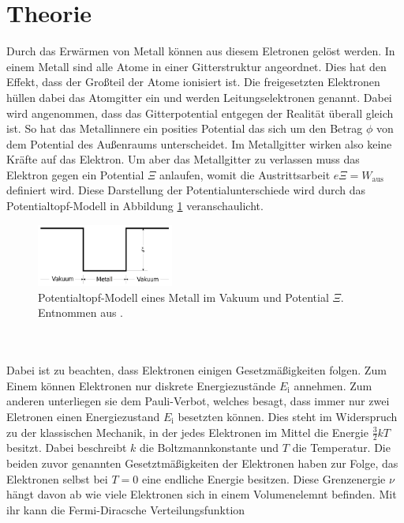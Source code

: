 \section{Theorie}
\label{sec:Theorie}

Durch das Erwärmen von Metall können aus diesem Eletronen gelöst werden.
In einem Metall sind alle Atome in einer Gitterstruktur angeordnet.
Dies hat den Effekt, dass der Großteil der Atome ionisiert ist.
Die freigesetzten Elektronen hüllen dabei das Atomgitter ein und werden Leitungselektronen genannt.
Dabei wird angenommen, dass das Gitterpotential entgegen der Realität überall gleich ist.
So hat das Metallinnere ein posities Potential das sich um den Betrag $\phi$ von dem Potential des Außenraums unterscheidet.
Im Metallgitter wirken also keine Kräfte auf das Elektron.
Um aber das Metallgitter zu verlassen muss das Elektron gegen ein Potential $\Xi$ anlaufen, womit die Austrittsarbeit $e\Xi = W_\text{aus}$ definiert wird.
Diese Darstellung der Potentialunterschiede wird durch das Potentialtopf-Modell in Abbildung \ref{fig:potentialtopf} veranschaulicht.
\begin{figure}
    \centering
    \includegraphics[width=0.4\textwidth]{content/data/potentialtopf.png}
    \caption{Potentialtopf-Modell eines Metall im Vakuum und Potential $\Xi$. Entnommen aus \cite[2]{anleitung}.}
    \label{fig:potentialtopf}
\end{figure}
\\\\
Dabei ist zu beachten, dass Elektronen einigen Gesetzmäßigkeiten folgen.
Zum Einem können Elektronen nur diskrete Energiezustände $E_\text{i}$ annehmen.
Zum anderen unterliegen sie dem Pauli-Verbot, welches besagt, dass immer nur zwei Eletronen einen Energiezustand $E_\text{i}$ besetzten können.
Dies steht im Widerspruch zu der klassischen Mechanik, in der jedes Elektronen im Mittel die Energie $\frac{3}{2} kT$ besitzt.
Dabei beschreibt $k$ die Boltzmannkonstante und $T$ die Temperatur.
Die beiden zuvor genannten Gesetztmäßigkeiten der Elektronen haben zur Folge, das Elektronen selbst bei $T=0$ eine endliche Energie besitzen.
Diese Grenzenergie $\nu$ hängt davon ab wie viele Elektronen sich in einem Volumenelemnt befinden.
Mit ihr kann die Fermi-Diracsche Verteilungsfunktion 
